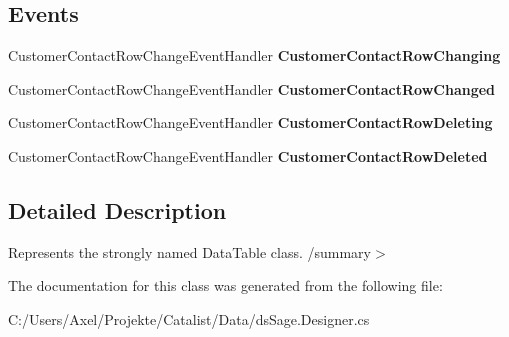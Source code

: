 \subsection*{Events}
\begin{DoxyCompactItemize}
\item 
Customer\+Contact\+Row\+Change\+Event\+Handler {\bfseries Customer\+Contact\+Row\+Changing}\hypertarget{class_products_1_1_data_1_1ds_sage_1_1_customer_contact_data_table_aab67704cbf620c960d3460b0205d5cf7}{}\label{class_products_1_1_data_1_1ds_sage_1_1_customer_contact_data_table_aab67704cbf620c960d3460b0205d5cf7}

\item 
Customer\+Contact\+Row\+Change\+Event\+Handler {\bfseries Customer\+Contact\+Row\+Changed}\hypertarget{class_products_1_1_data_1_1ds_sage_1_1_customer_contact_data_table_a84da1df86ca45e952e88513aaf061c67}{}\label{class_products_1_1_data_1_1ds_sage_1_1_customer_contact_data_table_a84da1df86ca45e952e88513aaf061c67}

\item 
Customer\+Contact\+Row\+Change\+Event\+Handler {\bfseries Customer\+Contact\+Row\+Deleting}\hypertarget{class_products_1_1_data_1_1ds_sage_1_1_customer_contact_data_table_a9d6031942106d7a6502db1f3603fa261}{}\label{class_products_1_1_data_1_1ds_sage_1_1_customer_contact_data_table_a9d6031942106d7a6502db1f3603fa261}

\item 
Customer\+Contact\+Row\+Change\+Event\+Handler {\bfseries Customer\+Contact\+Row\+Deleted}\hypertarget{class_products_1_1_data_1_1ds_sage_1_1_customer_contact_data_table_a3e6c4edd523133272e6fbb6bd386d653}{}\label{class_products_1_1_data_1_1ds_sage_1_1_customer_contact_data_table_a3e6c4edd523133272e6fbb6bd386d653}

\end{DoxyCompactItemize}


\subsection{Detailed Description}
Represents the strongly named Data\+Table class. /summary$>$ 

The documentation for this class was generated from the following file\+:\begin{DoxyCompactItemize}
\item 
C\+:/\+Users/\+Axel/\+Projekte/\+Catalist/\+Data/ds\+Sage.\+Designer.\+cs\end{DoxyCompactItemize}

